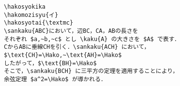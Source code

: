 \begin{verbatim}
\hakosyokika
\hakomozisyu{イ}
\hakosyotai{\textmc}
\sankaku{ABC}において，辺BC，CA，ABの長さを
それぞれ $a,~b,~c$ とし \kaku{A} の大きさを $A$ で表す．
CからABに垂線CHを引く．\sankaku{ACH} において，
$\text{CH}=\Hako,~\text{AH}=\Hako$ 
したがって，$\text{BH}=\Hako$
そこで，\sankaku{BCH} に三平方の定理を適用することにより，
余弦定理 $a^2=\Hako$ が導かれる．
\end{verbatim}
